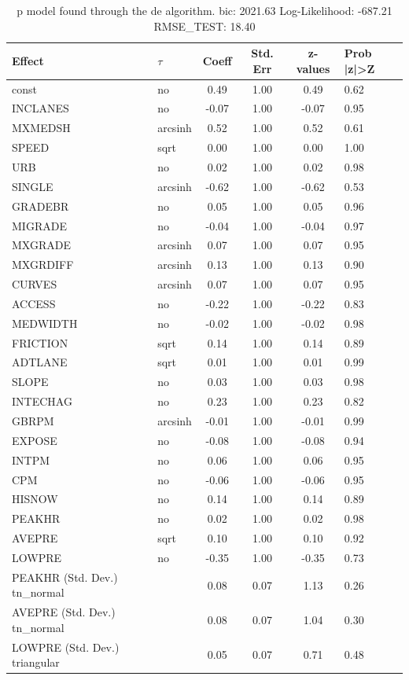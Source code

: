 \begin{table}
	\caption{p model found through the de algorithm. bic: 2021.63 Log-Likelihood: -687.21 RMSE_TEST: 18.40}
	\begin{center}
		\begin{tabular}{|l|l|c|c|c|l|}
			\hline
			Effect & $\tau$ & Coeff & Std. Err & z-values & Prob |z|>Z \\
			\hline
			const & no & 0.49 & 1.00 & 0.49 & 0.62 \\
			\hline
			INCLANES & no & -0.07 & 1.00 & -0.07 & 0.95 \\
			\hline
			MXMEDSH & arcsinh & 0.52 & 1.00 & 0.52 & 0.61 \\
			\hline
			SPEED & sqrt & 0.00 & 1.00 & 0.00 & 1.00 \\
			\hline
			URB & no & 0.02 & 1.00 & 0.02 & 0.98 \\
			\hline
			SINGLE & arcsinh & -0.62 & 1.00 & -0.62 & 0.53 \\
			\hline
			GRADEBR & no & 0.05 & 1.00 & 0.05 & 0.96 \\
			\hline
			MIGRADE & no & -0.04 & 1.00 & -0.04 & 0.97 \\
			\hline
			MXGRADE & arcsinh & 0.07 & 1.00 & 0.07 & 0.95 \\
			\hline
			MXGRDIFF & arcsinh & 0.13 & 1.00 & 0.13 & 0.90 \\
			\hline
			CURVES & arcsinh & 0.07 & 1.00 & 0.07 & 0.95 \\
			\hline
			ACCESS & no & -0.22 & 1.00 & -0.22 & 0.83 \\
			\hline
			MEDWIDTH & no & -0.02 & 1.00 & -0.02 & 0.98 \\
			\hline
			FRICTION & sqrt & 0.14 & 1.00 & 0.14 & 0.89 \\
			\hline
			ADTLANE & sqrt & 0.01 & 1.00 & 0.01 & 0.99 \\
			\hline
			SLOPE & no & 0.03 & 1.00 & 0.03 & 0.98 \\
			\hline
			INTECHAG & no & 0.23 & 1.00 & 0.23 & 0.82 \\
			\hline
			GBRPM & arcsinh & -0.01 & 1.00 & -0.01 & 0.99 \\
			\hline
			EXPOSE & no & -0.08 & 1.00 & -0.08 & 0.94 \\
			\hline
			INTPM & no & 0.06 & 1.00 & 0.06 & 0.95 \\
			\hline
			CPM & no & -0.06 & 1.00 & -0.06 & 0.95 \\
			\hline
			HISNOW & no & 0.14 & 1.00 & 0.14 & 0.89 \\
			\hline
			PEAKHR & no & 0.02 & 1.00 & 0.02 & 0.98 \\
			\hline
			AVEPRE & sqrt & 0.10 & 1.00 & 0.10 & 0.92 \\
			\hline
			LOWPRE & no & -0.35 & 1.00 & -0.35 & 0.73 \\
			\hline
			PEAKHR (Std. Dev.) tn_normal &  & 0.08 & 0.07 & 1.13 & 0.26 \\
			\hline
			AVEPRE (Std. Dev.) tn_normal &  & 0.08 & 0.07 & 1.04 & 0.30 \\
			\hline
			LOWPRE (Std. Dev.) triangular &  & 0.05 & 0.07 & 0.71 & 0.48 \\
			\hline
		\end{tabular}
	\end{center}
\end{table}